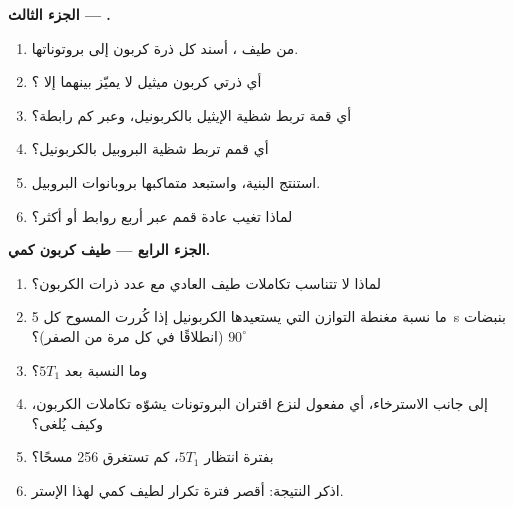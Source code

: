 \begin{problem}
\medskip\noindent\textbf{الجزء الثالث ---  .}
\begin{enumerate}[resume]
  \item من طيف ، أسند كل ذرة كربون إلى بروتوناتها.
  \item أي ذرتي كربون ميثيل لا يميّز بينهما إلا ؟
  \item أي قمة  تربط شظية الإيثيل بالكربونيل، وعبر
        كم رابطة؟
  \item أي قمم  تربط شظية البروبيل بالكربونيل؟
  \item استنتج البنية، واستبعد متماكبها بروبانوات البروبيل.
  \item لماذا تغيب عادة قمم  عبر أربع روابط أو أكثر؟
\end{enumerate}

\medskip\noindent\textbf{الجزء الرابع --- طيف كربون كمي.}
\begin{enumerate}[resume]
  \item لماذا لا تتناسب تكاملات طيف  العادي مع
        عدد ذرات الكربون؟
  \item ما نسبة مغنطة التوازن التي يستعيدها الكربونيل
        إذا كُررت المسوح كل \qty{5}{s} بنبضات $90^\circ$ (انطلاقًا في كل مرة
        من الصفر)؟
  \item وما النسبة بعد $5T_1$؟
  \item إلى جانب الاسترخاء، أي مفعول لنزع اقتران البروتونات يشوّه تكاملات
        الكربون، وكيف يُلغى؟
  \item بفترة انتظار $5T_1$، كم تستغرق 256 مسحًا؟
  \item اذكر النتيجة: أقصر فترة تكرار لطيف 
        كمي لهذا الإستر.
\end{enumerate}
\end{problem}
